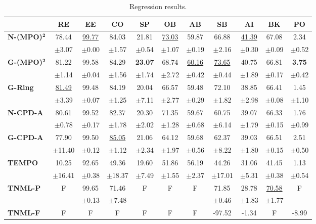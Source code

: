 \begin{table}[ht]
\centering
\small
\caption{Regression results.}
\label{tab:regression_results}
\begin{tabular}{lcccccccccc}
\toprule
& RE & EE & CO & SP & OB & AB & SB & AI & BK & PO \\
\midrule
\textbf{N-(MPO)}$\bm{^2}$ & 78.44 & \underline{99.77} & 84.03 & 21.81 & \underline{73.03} & 59.87 & 66.88 & \underline{41.39} & 67.08 & 2.34 \\
 & $\pm$3.07 & $\pm$0.00 & $\pm$1.57 & $\pm$0.54 & $\pm$1.07 & $\pm$0.19 & $\pm$2.16 & $\pm$0.30 & $\pm$0.09 & $\pm$0.52 \\
\midrule
\textbf{G-(MPO)}$\bm{^2}$ & 81.22 & 99.58 & 84.29 & \textbf{23.07} & 68.74 & \underline{60.16} & \underline{73.65} & 40.75 & 66.81 & \textbf{3.75} \\
 & $\pm$1.14 & $\pm$0.04 & $\pm$1.56 & $\pm$1.74 & $\pm$2.72 & $\pm$0.42 & $\pm$0.44 & $\pm$1.89 & $\pm$0.17 & $\pm$0.42 \\
\midrule
\textbf{G-Ring} & \underline{81.49} & 99.48 & 84.19 & 20.04 & 66.57 & 59.48 & 72.10 & 38.85 & 66.41 & 1.45 \\
 & $\pm$3.39 & $\pm$0.07 & $\pm$1.25 & $\pm$7.11 & $\pm$2.77 & $\pm$0.29 & $\pm$1.82 & $\pm$2.98 & $\pm$0.08 & $\pm$1.10 \\
\midrule
\midrule
\textbf{N-CPD-A} & 80.61 & 99.52 & 82.37 & 20.30 & 71.35 & 59.67 & 60.75 & 39.07 & 66.33 & 1.76 \\
 & $\pm$0.78 & $\pm$0.17 & $\pm$1.78 & $\pm$2.02 & $\pm$1.28 & $\pm$0.68 & $\pm$6.14 & $\pm$1.79 & $\pm$0.15 & $\pm$0.99 \\
\midrule
\textbf{G-CPD-A} & 77.90 & 99.50 & \underline{85.05} & 21.06 & 64.12 & 59.68 & 62.37 & 39.03 & 66.51 & 2.51 \\
 & $\pm$11.40 & $\pm$0.12 & $\pm$1.12 & $\pm$2.34 & $\pm$1.97 & $\pm$0.56 & $\pm$8.22 & $\pm$1.80 & $\pm$0.15 & $\pm$0.50 \\
\midrule
\textbf{TEMPO} & 10.25 & 92.65 & 49.36 & 19.60 & 51.86 & 56.19 & 44.26 & 31.06 & 41.45 & 1.13 \\
 & $\pm$16.41 & $\pm$0.38 & $\pm$18.37 & $\pm$7.49 & $\pm$1.55 & $\pm$2.37 & $\pm$17.01 & $\pm$5.31 & $\pm$0.38 & $\pm$0.54 \\
\midrule
\midrule
\textbf{TNML-P} & F & 99.65 & 71.46 & F & F & F & 71.85 & 28.78 & \underline{70.58} & F \\
 &  & $\pm$0.13 & $\pm$7.48 &  &  &  & $\pm$0.46 & $\pm$1.83 & $\pm$1.77 &  \\
\midrule
\textbf{TNML-F} & F & F & F & F & F & F & -97.52 & -1.34 & F & -8.99 \\

\end{tabular}
\end{table}
